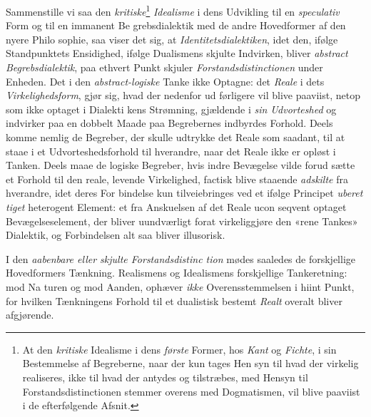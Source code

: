 Sammenstille vi saa den \emph{kritiske}\footnote{At den \emph{kritiske} Idealisme i dens \emph{første} Former, hos \emph{Kant} og
\emph{Fichte}, i sin Bestemmelse af Begreberne, naar der kun tages Hen\-%
syn til hvad der virkelig realiseres, ikke til hvad der antydes og
tilstræbes, med Hensyn til Forstandsdistinctionen stemmer overens
med Dogmatismen, vil blive paaviist i de efterfølgende Afsnit.} \emph{Idealisme} i dens
Udvikling til en \emph{speculativ} Form og til en immanent Be\-%
grebsdialektik med de andre Hovedformer af den nyere Philo\-%
sophie, saa viser det sig, at \emph{Identitetsdialektiken}, idet
den, ifølge Standpunktets Ensidighed, ifølge Dualismens skjulte
Indvirken, bliver \emph{abstract Begrebsdialektik}, paa ethvert
Punkt skjuler \emph{Forstandsdistinctionen} under Enheden.
Det i den \emph{abstract-logiske} Tanke ikke Optagne: det \emph{Reale}
i dets \emph{Virkelighedsform}, gjør sig, hvad der nedenfor ud\-%
førligere vil blive paaviist, netop som ikke optaget i Dialekti\-%
kens Strømning, gjældende i \emph{sin Udvorteshed} og indvirker
paa en dobbelt Maade paa Begrebernes indbyrdes Forhold.
Deels komme nemlig de Begreber, der skulle udtrykke det
Reale som saadant, til at staae i et Udvorteshedsforhold til
 hverandre, naar det Reale ikke er opløst i Tanken. Deels
maae de logiske Begreber, hvis indre Bevægelse vilde forud\-%
sætte et Forhold til den reale, levende Virkelighed, factisk
blive staaende \emph{adskilte} fra hverandre, idet deres For\-%
bindelse kun tilveiebringes ved et ifølge Principet \emph{uberet\-%
tiget} heterogent Element: et fra Anskuelsen af det Reale ucon\-%
seqvent optaget Bevægelseselement, der bliver uundværligt forat
virkeliggjøre den «rene Tankes» Dialektik, og Forbindelsen alt\-%
saa bliver illusorisk.

I den \emph{aabenbare eller skjulte Forstandsdistinc\-%
tion} mødes saaledes de forskjellige Hovedformers Tænkning.
Realismens og Idealismens forskjellige Tankeretning: mod Na\-%
turen og mod Aanden, ophæver \emph{ikke} Overensstemmelsen i
hiint Punkt, for hvilken Tænkningens Forhold til et dualistisk
bestemt \emph{Realt} overalt bliver afgjørende.

